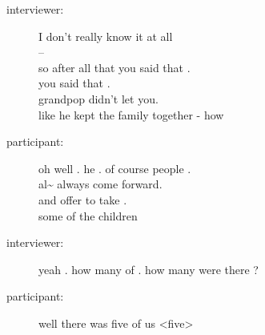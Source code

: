 \documentclass{article}
\newcommand{\turn}[2]{
\item[#1:] #2
}
\begin{document}
\begin{description}
\turn{interviewer}{I don't really know it at all\\
 -- \\
so after all that you said that .\\
you said that .\\
grandpop didn't let you.\\
like he kept the family together - how}

\turn{participant}{oh well . he . of course people .\\
al\~{}  always come forward.\\
and offer to take .\\
some of the children}

\turn{interviewer}{yeah . how many of . how many were there ?}

\turn{participant}{ well there was five of us \textless five\textgreater }


\end{description}
\end{document}
